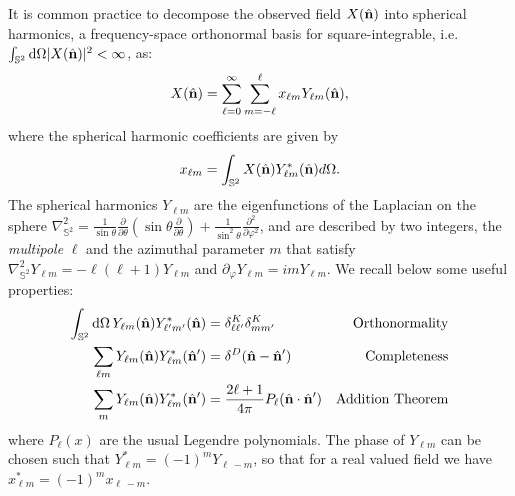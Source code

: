 It is common practice to decompose the observed field $X(\hat{\mathbf{n}})$ into spherical harmonics, a frequency-space orthonormal basis for square-integrable, i.e. $\int_{\mathbb{S}^2}\mathop{}\!\mathrm{d} \Omega |X(\hat{\mathbf{n}})|^2 < \infty$, as:
%
\begin{equation}
X(\hat{\mathbf{n}}) = \sum_{\ell=0}^{\infty} \sum_{m=-\ell}^{\ell} x_{\ell m}Y_{\ell m}(\hat{\mathbf{n}}),
\label{eqn:spharm}
\end{equation}
%
where the spherical harmonic coefficients are given by
%
\begin{equation}
\label{eqn:sphcoeff}
x_{\ell m} = \int_{\mathbb{S}^2}X(\hat{\mathbf{n}})Y^*_{\ell m}(\hat{\mathbf{n}})d\Omega.
\end{equation}
%
The spherical harmonics $Y_{\ell m}$ are the eigenfunctions of the Laplacian on the sphere $\nabla^2_{\mathbb{S}^2}=\frac{1}{\sin\theta}\frac
{\partial}{\partial\theta}
\left(\sin\theta\frac{\partial}{\partial\theta}\right)+\frac{1}{\sin^2\theta}\frac{\partial^2}{\partial\varphi^2}$, and are described by two integers, the \emph{multipole} $\ell$ and the azimuthal parameter $m$ that satisfy $\nabla^2_{\mathbb{S}^2} Y_{\ell m} = -\ell(\ell+1)Y_{\ell m}$ and $\partial_{\varphi} Y_{\ell m}= imY_{\ell m}$. We recall below some useful properties:
%
\begin{align}
\int_{\mathbb{S}^2} \mathop{}\!\mathrm{d}\Omega\, Y_{\ell m}(\hat{\mathbf{n}})Y^*_{\ell' m'}(\hat{\mathbf{n}}) &= \delta^K_{\ell\ell'}\delta^K_{mm'} &\text{Orthonormality}\\
\sum_{\ell m} Y_{\ell m}(\hat{\mathbf{n}})Y^*_{\ell m}(\hat{\mathbf{n}}') &= \delta^D(\hat{\mathbf{n}}-\hat{\mathbf{n}}') &\text{Completeness} \\
\sum_m Y_{\ell m}(\hat{\mathbf{n}})Y^*_{\ell m}(\hat{\mathbf{n}}') &= \frac{2\ell+1}{4\pi} P_{\ell}(\hat{\mathbf{n}}\cdot\hat{\mathbf{n}}') &\text{Addition Theorem} 
\end{align}
%
where $P_{\ell}(x)$ are the usual Legendre polynomials. The phase of $Y_{\ell m}$ can be chosen such  that $Y^*_{\ell m} = (-1)^mY_{\ell\, -m}$, so that for a real valued field we have $x^*_{\ell m}=(-1)^m x_{\ell\,-m}$.

